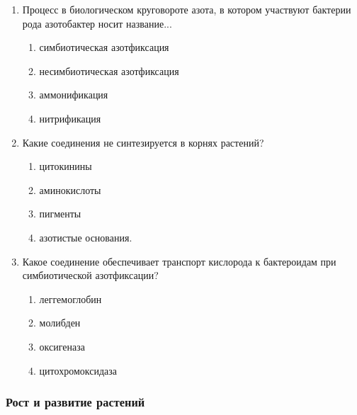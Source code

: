 \begin{enumerate}
\item Процесс в биологическом круговороте азота, в котором участвуют бактерии рода азотобактер носит название...
\begin{enumerate}
	\item симбиотическая азотфиксация    
	\item несимбиотическая азотфиксация
	\item аммонификация                            
	\item нитрификация
\end{enumerate}

\item Какие соединения не синтезируется в корнях растений?
\begin{enumerate}
	\item цитокинины         
	\item аминокислоты
	\item пигменты              
	\item азотистые основания.
\end{enumerate}

\item Какое соединение обеспечивает транспорт кислорода к бактероидам при симбиотической азотфиксации?
\begin{enumerate}
	\item леггемоглобин               
	\item молибден
	\item оксигеназа                     
	\item цитохромоксидаза
\end{enumerate}

\end{enumerate}

\subsubsection*{Рост и развитие растений}

